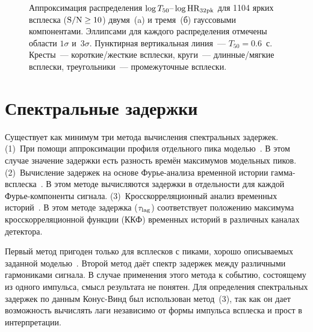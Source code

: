 \begin{figure}[h]
  \begin{minipage}[h]{0.5\textwidth}
  \end{minipage}
  \hfill
  \begin{minipage}[h]{0.5\textwidth}
  \end{minipage}
  \caption[Аппроксимация распределения $\log T_{50}\textrm{--}\log \mbox{HR}_{32\rmn{pk}}$.]
  {Аппроксимация распределения $\log T_{50}\textrm{--}\log \mbox{HR}_{32\rmn{pk}}$ 
  для 1104 ярких всплеска (${\mathrm{S/N}} \geq 10$) двумя~(a) и тремя~(б) гауссовыми компонентами. 
  Эллипсами для каждого распределения отмечены области $1\sigma$ и~$3\sigma$. 
  Пунктирная вертикальная линия~--- $T_{50} = 0.6$~с. Кресты~--- короткие/жесткие всплески, 
  круги~--- длинные/мягкие всплески, треугольники~--- промежуточные всплески.}
  \label{img:HRpkvsT50}  
\end{figure}

\clearpage

\section{Спектральные задержки}\label{sec:Lags}
Существует как минимум три метода вычисления спектральных задержек. 
(1)~При помощи аппроксимации  профиля отдельного пика моделью~\citep{Norris_2005ApJ, Hakkila_2008}. 
В этом случае значение задержки есть разность времён максимумов модельных пиков. 
(2)~Вычисление задержек на основе Фурье-анализа временной истории гамма-всплеска~\citep{Li_2004}. 
В этом методе вычисляются задержки в отдельности для каждой Фурье-компоненты сигнала. 
(3)~Кросскорреляционный анализ временных историй~\citep{Band_1997ApJ, Norris_2000}. 
В этом методе задержка ($\tau_{{\mathrm{lag}}}$) соответствует положению максимума кросскорреляционной 
функции (ККФ) временных историй в различных каналах детектора.

Первый метод пригоден только для всплесков с пиками, хорошо описываемых 
заданной моделью~\citep[формула (1) в][]{Norris_2005ApJ}. Второй метод даёт спектр 
задержек между различными гармониками сигнала. В случае применения этого метода 
к событию, состоящему из одного импульса, смысл результата не понятен. 
Для определения спектральных задержек по данным Конус-Винд был использован метод~(3), 
так как он дает возможность вычислять лаги независимо от формы импульса всплеска 
и прост в интерпретации.

